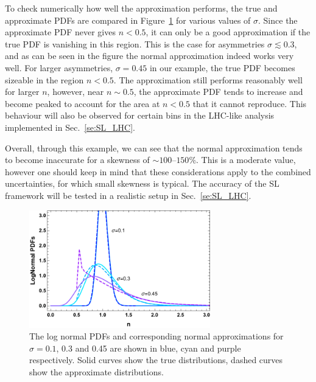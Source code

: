 \documentclass[11pt]{article}
\begin{document}
To check numerically how well the approximation performs, the true and approximate PDFs are compared in Figure~\ref{fig:approxs} for various values of $\sigma$.  
Since the approximate PDF never gives $n<0.5$, it can only be a good approximation if the true PDF is vanishing in this region. This is the case for
asymmetries $\sigma \lesssim 0.3$, and as can be seen in the figure the normal approximation indeed works very well.
For larger asymmetries, $\sigma = 0.45$ in our example, the true PDF becomes sizeable in the region $n<0.5$. 
The approximation still performs reasonably well for larger $n$, however, near $n\sim 0.5$, 
the approximate PDF tends to increase and become peaked to account for the area at $n<0.5$ that it cannot reproduce. 
This behaviour will also be observed for certain bins in the LHC-like analysis implemented in Sec.~\ref{se:SL_LHC}.

Overall, through this example, we can see that the normal approximation tends to become inaccurate for a skewness of $\sim 100$--$150\%$. 
This is a moderate value, however one should keep in mind that these considerations apply to the combined uncertainties, for which small skewness is typical. The accuracy of the SL framework will be tested in a realistic setup in Sec.~\ref{se:SL_LHC}.


\begin{figure}[t]
\begin{center}
\includegraphics[width=0.7\textwidth]{figures/PlotLogNormal.pdf}
\end{center}
\caption{\label{fig:approxs} 
The log normal PDFs and corresponding normal approximations for $\sigma = 0.1$, 0.3 and 0.45 are shown in blue, cyan and purple respectively. Solid curves show the true distributions, dashed curves show the approximate distributions. 
}
\end{figure}
\end{document}
